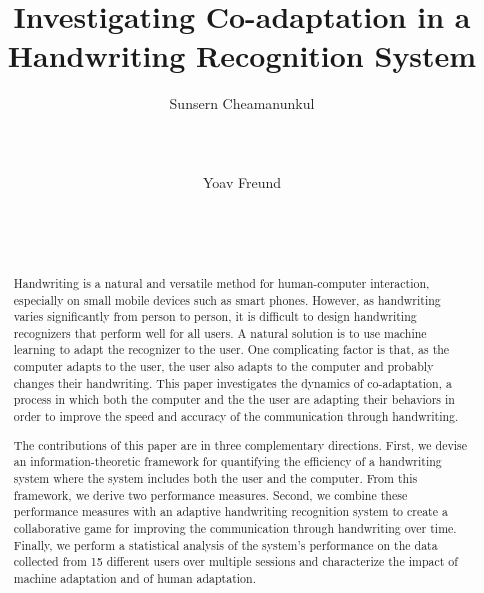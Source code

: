 \documentclass{sigchi}
\begin{document}
\title{Investigating Co-adaptation in a Handwriting Recognition System}

\author{
  \alignauthor Sunsern Cheamanunkul\\
    \\
    \\
    \\
  \alignauthor Yoav Freund\\
    \\
    \\
    \\
}


\maketitle

\begin{abstract}
  Handwriting is a natural and versatile method for human-computer
  interaction, especially on small mobile devices such as smart
  phones. However, as handwriting varies significantly from person to
  person, it is difficult to design handwriting recognizers that
  perform well for all users. A natural solution is to use machine
  learning to adapt the recognizer to the user. One complicating
  factor is that, as the computer adapts to the user, the user also
  adapts to the computer and probably changes their handwriting. This
  paper investigates the dynamics of co-adaptation, a process in which
  both the computer and the the user are adapting their behaviors in
  order to improve the speed and accuracy of the communication through
  handwriting.

  The contributions of this paper are in three complementary
  directions. First, we devise an information-theoretic framework for
  quantifying the efficiency of a handwriting system where the system
  includes both the user and the computer. From this framework, we
  derive two performance measures. Second, we combine these
  performance measures with an adaptive handwriting recognition system
  to create a collaborative game for improving the communication
  through handwriting over time. Finally, we perform a statistical
  analysis of the system’s performance on the data collected from 15
  different users over multiple sessions and characterize the impact
  of machine adaptation and of human adaptation.
\end{abstract}
\end{document}
